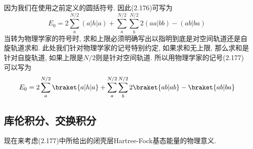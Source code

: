因为我们在使用之前定义的圆括符号. 
因此(2.176)可写为
\begin{equation}
E_0 = 2 \sum_{a}^{N/2}({a|h|a}) + \sum_{a}^{N/2}\sum_{b}^{N/2}2({aa|bb}) - ({ab|ba})
\end{equation}
当转为物理学家的符号时, 
求和上限必须明确写出以指明到底是对空间轨道还是自旋轨道求和. 
此处我们针对物理学家的记号特别约定, 
如果求和无上限, 
那么求和是针对自旋轨道, 
如果上限是$N/2$则是针对空间轨道. 
所以用物理学家的记号(2.177)可以写为
\begin{equation}
E_0 = 2 \sum_{a}^{N/2}\braket{a|h|a} + \sum_{a}^{N/2}\sum_{b}^{N/2}2\braket{ab|ab} - \braket{ab|ba}
\end{equation}

\subsection{库伦积分、交换积分}
\label{sec2.3.6}
现在来考虑(2.177)中所给出的闭壳层Hartree-Fock基态能量的物理意义.

